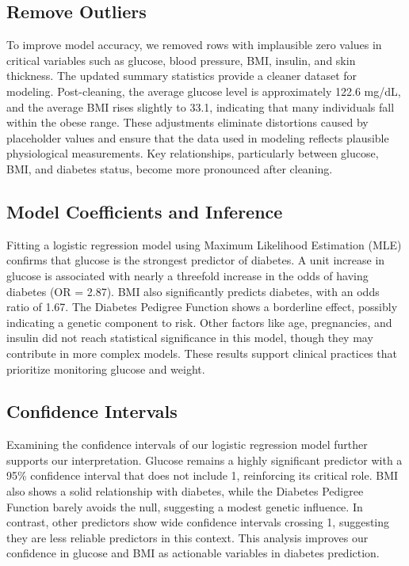 \documentclass[
]{article}
\begin{document}
\subsection{Remove Outliers}\label{remove-outliers}

To improve model accuracy, we removed rows with implausible zero values
in critical variables such as glucose, blood pressure, BMI, insulin, and
skin thickness. The updated summary statistics provide a cleaner dataset
for modeling. Post-cleaning, the average glucose level is approximately
122.6 mg/dL, and the average BMI rises slightly to 33.1, indicating that
many individuals fall within the obese range. These adjustments
eliminate distortions caused by placeholder values and ensure that the
data used in modeling reflects plausible physiological measurements. Key
relationships, particularly between glucose, BMI, and diabetes status,
become more pronounced after cleaning.

\subsection{Model Coefficients and
Inference}\label{model-coefficients-and-inference-1}

Fitting a logistic regression model using Maximum Likelihood Estimation
(MLE) confirms that glucose is the strongest predictor of diabetes. A
unit increase in glucose is associated with nearly a threefold increase
in the odds of having diabetes (OR = 2.87). BMI also significantly
predicts diabetes, with an odds ratio of 1.67. The Diabetes Pedigree
Function shows a borderline effect, possibly indicating a genetic
component to risk. Other factors like age, pregnancies, and insulin did
not reach statistical significance in this model, though they may
contribute in more complex models. These results support clinical
practices that prioritize monitoring glucose and weight.

\subsection{Confidence Intervals}\label{confidence-intervals}

Examining the confidence intervals of our logistic regression model
further supports our interpretation. Glucose remains a highly
significant predictor with a 95\% confidence interval that does not
include 1, reinforcing its critical role. BMI also shows a solid
relationship with diabetes, while the Diabetes Pedigree Function barely
avoids the null, suggesting a modest genetic influence. In contrast,
other predictors show wide confidence intervals crossing 1, suggesting
they are less reliable predictors in this context. This analysis
improves our confidence in glucose and BMI as actionable variables in
diabetes prediction.
\end{document}
